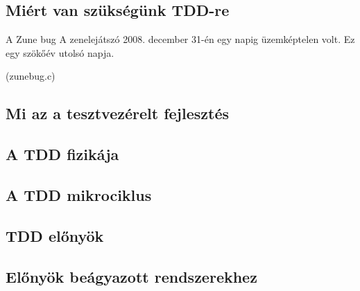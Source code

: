 \subsection{Miért van szükségünk TDD-re}

\begin{frame}{A Zune bug}
  A zenelejátszó 2008. december 31-én egy napig üzemképtelen volt. Ez
  egy szökőév utolsó napja.

  (zunebug.c)
\end{frame}

\subsection{Mi az a tesztvezérelt fejlesztés}

\subsection{A TDD fizikája}

\subsection{A TDD mikrociklus}

\subsection{TDD előnyök}

\subsection{Előnyök beágyazott rendszerekhez}


